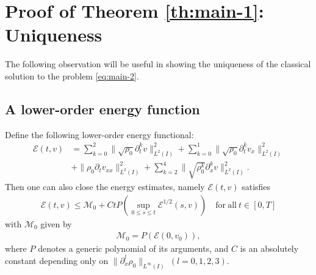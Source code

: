 \documentclass[11pt, reqno]{amsart}
\numberwithin{equation}{section}
\begin{document}
{\section{Proof of Theorem \ref{th:main-1}: Uniqueness}\label{Uniqueness Part}

The following observation will be useful in showing the uniqueness of the classical solution to the problem \eqref{eq:main-2}.

\subsection{A lower-order energy function}\label{lower-order energy function}


Define the following lower-order energy functional:
\begin{equation}\label{energy function-2}
	\begin{aligned}
		\mathcal{E}(t,v)&=\sum_{k=0}^2\|\sqrt{\rho_0}\partial_t^kv\|_{L^2(I)}^2
		+\sum_{k=0}^1\|\sqrt{\rho_0}\partial_t^kv_x\|_{L^2(I)}^2\\
		&+\|\rho_0\partial_tv_{xx}\|_{L^2(I)}^2+\sum_{k=2}^4\big\|\sqrt{\rho_0^k}\partial_x^kv\big\|_{L^2(I)}^2.
	\end{aligned}
\end{equation}
Then one can also close the energy estimates, namely \(\mathcal{E}(t,v)\) satisfies 	
\begin{equation}\label{a priori bound-2}
	\begin{aligned}
		\mathcal{E}(t,v)
		\leq \mathcal{M}_0+CtP(\sup_{0\leq s\leq t}\mathcal{E}^{1/2}(s,v))\quad \mathrm{for\ all}\ t\in [0,T]
	\end{aligned}
\end{equation}
with \(\mathcal{M}_0\) given by
\begin{align*}
	\mathcal{M}_0=P(\mathcal{E}(0,v_0)),
\end{align*}
where \(P\) denotes a generic polynomial of its arguments, and \(C\) is an absolutely constant depending only on \(\|\partial_x^l\rho_0\|_{L^\infty(I)}\ (l=0,1,2,3)\).\\

}
\end{document}
